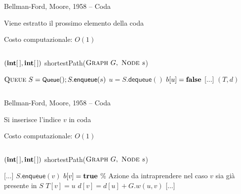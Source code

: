\begin{frame}{Bellman-Ford, Moore, 1958 -- Coda}

\smallskip
{}
\BI
\item Viene estratto il prossimo elemento della coda
\item Costo computazionale: $O(1)$
\EI

\vspace{-18pt}
\begin{columns}
\small
\begin{Procedure}
\caption[A]{$(\INTARRAY, \INTARRAY)$ \textsf{shortestPath}($\textsc{Graph}\ G,\ \textsc{Node}\ s$)}
$\textsc{Queue}\ S = \textsf{{\small Queue}}(); S.\textsf{enqueue}(s)$\;
{
  \alert{$u = S.\textsf{dequeue}()$}\;
  $b[u] = \FALSE$\;
  {
    {
      [...]
    }
  }
}
\Return $(T,d)$
\end{Procedure}
\end{columns}

\end{frame}

\begin{frame}{Bellman-Ford, Moore, 1958 -- Coda}

\smallskip
{}
\BI
\item Si inserisce l'indice $v$ in coda
\item Costo computazionale: $O(1)$
\EI

\vspace{-18pt}
\begin{columns}
\small
\begin{Procedure}
\caption[A]{$(\INTARRAY, \INTARRAY)$ \textsf{shortestPath}($\textsc{Graph}\ G,\ \textsc{Node}\ s$)}
[...]\;
    {
      {
        \alert{$S.\textsf{enqueue}(v)$}\;
        $b[v] = \TRUE$\;
      }
      {
        \% Azione da intraprendere nel caso $v$ sia già presente in $S$
      }
      $T[v] = u$\;
      $d[v] = d[u] + G.w(u,v)$\;
    }
[...]\;
\end{Procedure}
\end{columns}

\end{frame}

